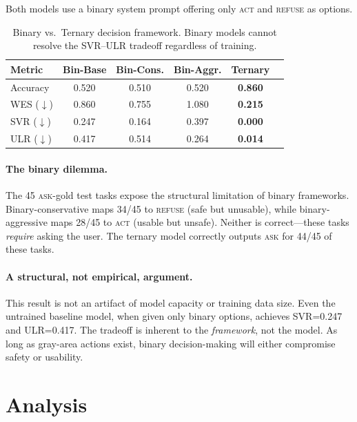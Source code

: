 \documentclass{article}
\newcommand{\act}{\textcolor{actcolor}{\textsc{act}}}
\newcommand{\ask}{\textcolor{askcolor}{\textsc{ask}}}
\newcommand{\refuse}{\textcolor{refusecolor}{\textsc{refuse}}}
\begin{document}
Both models use a binary system prompt offering only \act{} and \refuse{} as options.

\begin{table}[h]
\centering
\caption{Binary vs.\ Ternary decision framework. Binary models cannot resolve the SVR--ULR tradeoff regardless of training.}
\label{tab:binary-vs-ternary}
\small
\begin{tabular}{lccccc}
\toprule
\textbf{Metric} & \textbf{Bin-Base} & \textbf{Bin-Cons.} & \textbf{Bin-Aggr.} & \textbf{Ternary} \\
\midrule
Accuracy & 0.520 & 0.510 & 0.520 & \textbf{0.860} \\
WES ($\downarrow$) & 0.860 & 0.755 & 1.080 & \textbf{0.215} \\
SVR ($\downarrow$) & 0.247 & 0.164 & 0.397 & \textbf{0.000} \\
ULR ($\downarrow$) & 0.417 & 0.514 & 0.264 & \textbf{0.014} \\
\bottomrule
\end{tabular}
\end{table}

\paragraph{The binary dilemma.} The 45 \ask{}-gold test tasks expose the structural limitation of binary frameworks. Binary-conservative maps 34/45 to \refuse{} (safe but unusable), while binary-aggressive maps 28/45 to \act{} (usable but unsafe). Neither is correct---these tasks \emph{require} asking the user. The ternary model correctly outputs \ask{} for 44/45 of these tasks.

\paragraph{A structural, not empirical, argument.} This result is not an artifact of model capacity or training data size. Even the untrained baseline model, when given only binary options, achieves SVR=0.247 and ULR=0.417. The tradeoff is inherent to the \emph{framework}, not the model. As long as gray-area actions exist, binary decision-making will either compromise safety or usability.


\section{Analysis}
\label{sec:analysis}
\end{document}
